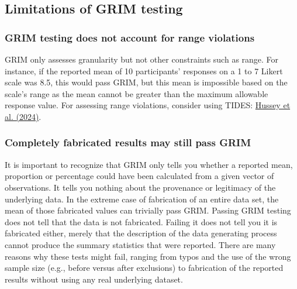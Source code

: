 \documentclass[letterpaper, 12pt]{article}
\begin{document}
\subsection*{Limitations of GRIM testing}

\subsubsection*{GRIM testing does not account for range violations}

GRIM only assesses granularity but not other constraints such as range. For instance, if the reported mean of 10 participants' responses on a 1 to 7 Likert scale was 8.5, this would pass GRIM, but this mean is impossible based on the scale's range as the mean cannot be greater than the maximum allowable response value. For assessing range violations, consider using TIDES: \href{https://github.com/ianhussey/tides}{Hussey et al. (2024)}. 

\subsubsection*{Completely fabricated results may still pass GRIM}

It is important to recognize that GRIM only tells you whether a reported mean, proportion or percentage could have been calculated from a given vector of observations. It tells you nothing about the provenance or legitimacy of the underlying data. In the extreme case of fabrication of an entire data set, the mean of those fabricated values can trivially pass GRIM. Passing GRIM testing does not tell that the data is not fabricated. Failing it does not tell you it is fabricated either, merely that the description of the data generating process cannot produce the summary statistics that were reported. There are many reasons why these tests might fail, ranging from typos and the use of the wrong sample size (e.g., before versus after exclusions) to fabrication of the reported results without using any real underlying dataset. 
\end{document}
